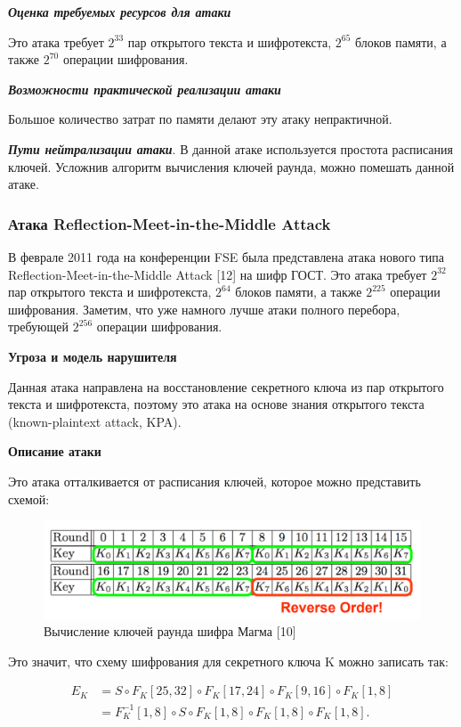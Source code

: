 \documentclass[colorthm]{./civarticle}
\begin{document}
\textbf{\emph{Оценка требуемых ресурсов для атаки}}

Это атака требует $2^{33}$ пар открытого текста и шифротекста, $2^{65}$ блоков памяти, а также $2^{70}$ операции шифрования.

\textbf{\emph{Возможности практической реализации атаки}}

Большое количество затрат по памяти делают эту атаку непрактичной.

\textbf{\emph{Пути нейтрализации атаки}}. В данной атаке используется простота расписания ключей. Усложнив алгоритм вычисления ключей раунда, можно помешать данной атаке.


\subsubsection{Атака Reflection-Meet-in-the-Middle Attack}
В феврале 2011 года на конференции FSE была представлена атака нового типа Reflection-Meet-in-the-Middle Attack [12] на шифр ГОСТ. Это атака требует $2^{32}$ пар открытого текста и шифротекста, $2^{64}$ блоков памяти, а также $2^{225}$ операции шифрования. Заметим, что уже намного лучше атаки полного перебора, требующей $2^{256}$ операции шифрования.

\textbf{Угроза и модель нарушителя} 

Данная атака направлена на восстановление секретного ключа из пар открытого текста и шифротекста, поэтому это атака на основе знания открытого текста (known-plaintext attack, KPA).

\textbf{Описание атаки}

Это атака отталкивается от расписания ключей, которое можно представить схемой:

\begin{figure}
    \centering
    \includegraphics[width=0.5\linewidth]{Снимок экрана 2024-01-17 162824.png}
    \caption{Вычисление ключей раунда шифра Магма [10]}
    \label{fig:enter-label}
\end{figure}

Это значит, что схему шифрования для секретного ключа K можно записать так:

\begin{equation}
    \begin{aligned}
E_K & =S \circ F_K[25,32] \circ F_K[17,24] \circ F_K[9,16] \circ F_K[1,8] \\
& =F_K^{-1}[1,8] \circ S \circ F_K[1,8] \circ F_K[1,8] \circ F_K[1,8] .
\end{aligned}
\end{equation}
\end{document}
